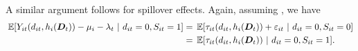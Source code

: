 A similar argument follows for spillover effects. Again, assuming , we have 
\begin{align*}
  \expec{Y_{it}(d_{it}, h_i(\bm{D}_t)) - \mu_i - \lambda_t \ | \ d_{it} = 0, S_{it} = 1} 
  &= \expec{\tau_{it}(d_{it}, h_i(\bm{D}_t)) + \varepsilon_{it} \ | \ d_{it} = 0, S_{it} = 0} \\
  &= \expec{\tau_{it}(d_{it}, h_i(\bm{D}_t)) \ | \ d_{it} = 0, S_{it} = 1}.
\end{align*}
\vspace*{-5mm}
